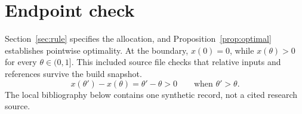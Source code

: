\section{Endpoint check}\label{sec:endpoint}
Section~\ref{sec:rule} specifies the allocation, and Proposition~\ref{prop:optimal} establishes pointwise optimality.
At the boundary, $x(0)=0$, while $x(\theta)>0$ for every $\theta\in(0,1]$.
This included source file checks that relative inputs and references survive the build snapshot.
\begin{equation}
  x(\theta')-x(\theta)=\theta'-\theta>0
  \qquad\text{when }\theta'>\theta.
\end{equation}
The local bibliography below contains one synthetic record, not a cited research source.
